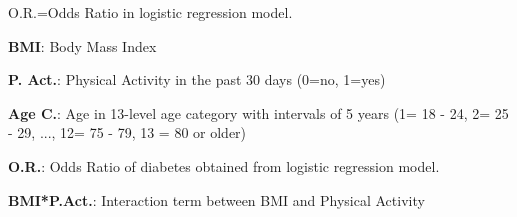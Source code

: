 \documentclass[11pt]{article}
\begin{document}
\begin{table}[h]
\caption{\protect\hyperlink{file-df-1-pkl}{Logistic regression effect of physical activity on BMI and Diabetes, with age control}}
\label{table:df_1}
\begin{threeparttable}
\renewcommand{\TPTminimum}{\linewidth}
\begin{tablenotes}
\footnotesize
\item O.R.=Odds Ratio in logistic regression model.
\item \textbf{BMI}: Body Mass Index
\item \textbf{P. Act.}: Physical Activity in the past 30 days (0=no, 1=yes)
\item \textbf{Age C.}: Age in 13-level age category with intervals of 5 years (1= 18 - 24, 2= 25 - 29, ..., 12= 75 - 79, 13 = 80 or older)
\item \textbf{O.R.}: Odds Ratio of diabetes obtained from logistic regression model.
\item \textbf{BMI*P.Act.}: Interaction term between BMI and Physical Activity
\end{tablenotes}
\end{threeparttable}
\end{table}
\end{document}
